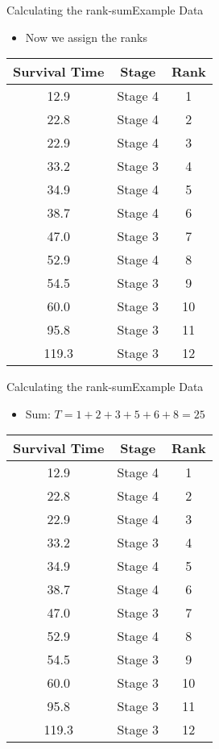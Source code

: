 \documentclass[xcolor=dvipsnames]{beamer}
\begin{document}
\begin{frame}{Calculating the rank-sum}{Example Data}
\begin{itemize}
	\item Now we assign the ranks
\end{itemize}
\begin{center}
	\begin{tabular}{|c|c|c|}
		\hline
		\textbf{Survival Time} &  \textbf{Stage} & \textbf{Rank}\\ \hline \hline
		12.9 &Stage 4 & 1 \\ \hline
		22.8 &Stage 4 & 2\\ \hline
		22.9& Stage 4 & 3\\ \hline
		33.2 &Stage 3 & 4\\ \hline
		34.9& Stage 4 & 5\\ \hline
		38.7 &Stage 4 & 6\\ \hline
		47.0 &Stage 3 & 7\\ \hline		
		52.9  &Stage 4 & 8\\ \hline
		54.5 &Stage 3 & 9\\ \hline				
		60.0 &Stage 3 & 10\\ \hline
		95.8& Stage 3 & 11\\ \hline
		119.3 &Stage 3 & 12\\ \hline
	\end{tabular}
\end{center}
\end{frame}

\begin{frame}{Calculating the rank-sum}{Example Data}
\begin{itemize}
	\item Sum: $T = 1 + 2 + 3 + 5 + 6 + 8 = 25$
\end{itemize}
\begin{center}
	\begin{tabular}{|c|c|c|}
		\hline
		\textbf{Survival Time} &  \textbf{Stage} & \textbf{Rank}\\ \hline \hline
		12.9 &Stage 4 & 1 \\ \hline
		22.8 &Stage 4 & 2\\ \hline
		22.9& Stage 4 & 3\\ \hline
		33.2 &Stage 3 & 4\\ \hline
		34.9& Stage 4 & 5\\ \hline
		38.7 &Stage 4 & 6\\ \hline
		47.0 &Stage 3 & 7\\ \hline		
		52.9  &Stage 4 & 8\\ \hline
		54.5 &Stage 3 & 9\\ \hline				
		60.0 &Stage 3 & 10\\ \hline
		95.8& Stage 3 & 11\\ \hline
		119.3 &Stage 3 & 12\\ \hline
	\end{tabular}
\end{center}
\end{frame}
\end{document}
